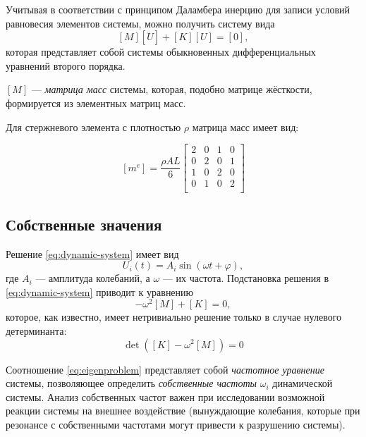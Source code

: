 \documentclass[10pt]{article}
\numberwithin{equation}{section}
\renewcommand{\phi}{\varphi}
\newcommand{\neword}{\emph}
\newcommand{\matr}[1]{[#1]}
\begin{document}


Учитывая в соответствии с принципом Даламбера инерцию для записи
условий равновесия элементов системы, можно получить систему вида
\begin{equation}
  \label{eq:dynamic-system}
  \matr{M}\matr{\ddot{U}} + \matr{K}\matr{U} = \matr{0},
\end{equation}
которая представляет собой системы обыкновенных дифференциальных
уравнений второго порядка.

$\matr{M}$ — \neword{матрица масс} системы, которая, подобно матрице
жёсткости, формируется из элементных матриц масс.

Для стержневого элемента с плотностью $\rho$ матрица масс имеет вид:

\begin{equation}
  \label{eq:bar-mass}
  \matr{m^e} = \frac{\rho AL}{6}
  \begin{bmatrix}
    2&0&1&0\\
    0&2&0&1\\
    1&0&2&0\\
    0&1&0&2\\
  \end{bmatrix}
\end{equation}

\subsection{Собственные значения}

Решение \eqref{eq:dynamic-system} имеет вид
\begin{equation*}
U_i (t) = A_i \sin(\omega t + \phi),
\end{equation*}
где $A_i$ — амплитуда колебаний, а $\omega$ — их частота. Подстановка
решения в \eqref{eq:dynamic-system} приводит к уравнению
\begin{equation*}
  -\omega^2 \matr{M} + \matr{K} = 0,
\end{equation*}
которое, как известно, имеет нетривиально решение только в случае
нулевого детерминанта:
\begin{equation}
  \label{eq:eigenproblem}
  \det(\matr{K}-\omega^2\matr{M}) = 0
\end{equation}

Соотношение \eqref{eq:eigenproblem} представляет собой
\neword{частотное уравнение} системы, позволяющее определить
\neword{собственные частоты} ${\omega_i}$ динамической системы. Анализ
собственных частот важен при исследовании возможной реакции системы на
внешнее воздействие (вынуждающие колебания, которые при резонансе с
собственными частотами могут привести к разрушению системы).
\end{document}
